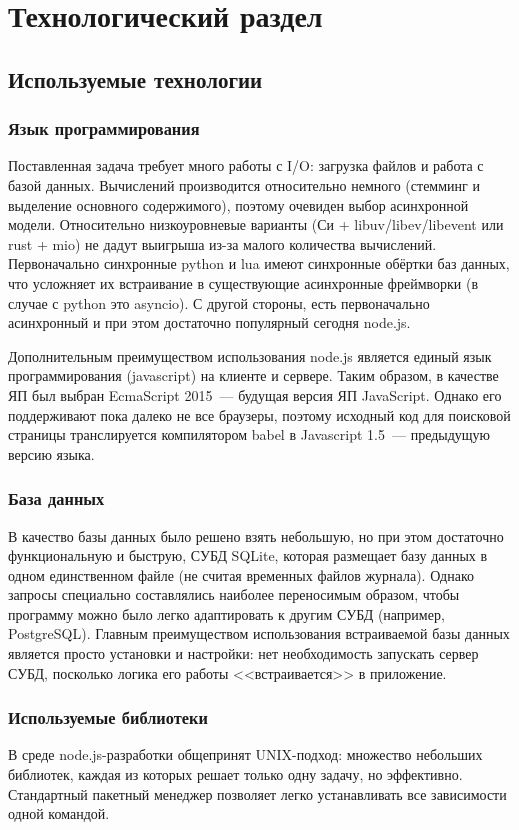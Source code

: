 \chapter{Технологический раздел}
\section{Используемые технологии}
\subsection*{Язык программирования}
Поставленная задача требует много работы с I/O: загрузка файлов и работа с базой данных. Вычислений производится относительно немного (стемминг и выделение основного содержимого), поэтому очевиден выбор асинхронной модели. Относительно низкоуровневые варианты (Си + libuv/libev/libevent или rust + mio) не дадут выигрыша из-за малого количества вычислений. Первоначально синхронные python и lua имеют синхронные обёртки баз данных, что усложняет их встраивание в существующие асинхронные фреймворки (в случае с python это asyncio). С другой стороны, есть первоначально асинхронный и при этом достаточно популярный сегодня node.js.

Дополнительным преимуществом использования node.js является единый язык программирования (javascript) на клиенте и сервере. Таким образом, в качестве ЯП был выбран EcmaScript 2015~--- будущая версия ЯП JavaScript. Однако его поддерживают  пока далеко не все браузеры, поэтому исходный код для поисковой страницы транслируется компилятором babel в Javascript 1.5~--- предыдущую версию языка.


\subsection*{База данных}
В качество базы данных было решено взять небольшую, но при этом достаточно функциональную и быструю, СУБД SQLite, которая размещает базу данных в одном единственном файле (не считая временных файлов журнала). Однако запросы специально составлялись наиболее переносимым образом, чтобы программу можно было легко адаптировать к другим СУБД (например, PostgreSQL). Главным преимуществом использования встраиваемой базы данных является просто установки и настройки: нет необходимость запускать сервер СУБД, посколько логика его работы <<встраивается>> в приложение.


\subsection*{Используемые библиотеки}
В среде node.js-разработки общепринят UNIX-подход: множество небольших библиотек, каждая из которых решает только одну задачу, но эффективно. Стандартный пакетный менеджер позволяет легко устанавливать все зависимости одной командой.

